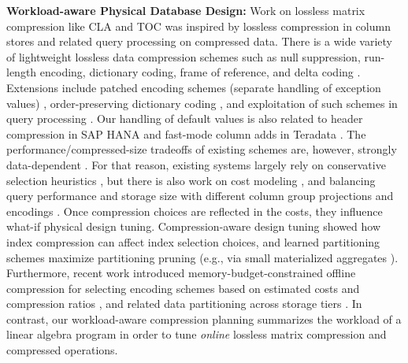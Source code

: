 \textbf{Workload-aware Physical Database Design:} Work on lossless matrix compression like CLA \cite{ElgoharyBHRR16,ElgoharyBHRR18} and TOC \cite{LiCZ00NP19} was inspired by lossless compression in column stores and related query processing on compressed data. There is a wide variety of lightweight lossless data compression schemes such as null suppression, run-length encoding, dictionary coding, frame of reference, and delta coding \cite{AbadiMF06,AbadiBH09}. Extensions include patched encoding schemes (separate handling of exception values) \cite{ZukowskiHNB06}, order-preserving dictionary coding \cite{BinnigHF09,LiuUJSME19}, and exploitation of such schemes in query processing \cite{RamanABCKKLLLLMMPSSSSZ13,BinnigHF09,LangMFB0K16,AthanassoulisBS19}. Our handling of default values is also related to header compression in SAP HANA \cite{saphana} and fast-mode column adds in Teradata \cite{teradata}. The performance/compressed-size tradeoffs of existing schemes are, however, strongly data-dependent \cite{HollowayRSD07,DammeUHHL19}. For that reason, existing systems largely rely on conservative selection heuristics \cite{LangMFB0K16,AbadiMF06,AbadiBH09}, but there is also work on cost modeling \cite{DammeUHHL19,0001J19,CenKMK21}, and balancing query performance and storage size with different column group projections and encodings \cite{RamakrishnaCAJS}. Once compression choices are reflected in the costs, they influence what-if physical design tuning. Compression-aware design tuning \cite{KimuraNS11} showed how index compression can affect index selection choices, and learned partitioning schemes maximize partitioning pruning \cite{YangCWGLMLKA20} (e.g., via small materialized aggregates \cite{Moerkotte98}). Furthermore, recent work introduced memory-budget-constrained offline compression for selecting encoding schemes based on estimated costs and compression ratios \cite{Boissier22}, and related data partitioning across storage tiers \cite{LaschSLS21,0001RIL0K20}. In contrast, our workload-aware compression planning summarizes the workload of a linear algebra program in order to tune \emph{online} lossless matrix compression and compressed operations. 

